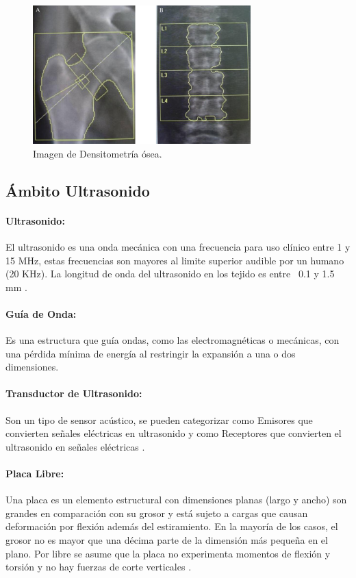 \begin{figure}[H]
    \centering
    \includegraphics[width=0.75\textwidth]{imagenes/image6.jpg}
    \caption{Imagen de Densitometría ósea.}
    \label{fig:bmd}
\end{figure}

\subsection{Ámbito Ultrasonido}

\paragraph{Ultrasonido:}
El ultrasonido es una onda mecánica con una frecuencia para uso clínico entre 1 y 15 MHz, estas frecuencias son mayores al limite superior audible por un humano (20 KHz). La longitud de onda del ultrasonido en los tejido es entre ~0.1 y 1.5 mm
\cite{nadinebarriesmith2010}
\cite{Abu-Zidan2011}.

\paragraph{Guía de Onda:}
Es una estructura que guía ondas, como las electromagnéticas o mecánicas, con una pérdida mínima de energía al restringir la expansión a una o dos dimensiones.

\paragraph{Transductor de Ultrasonido:}
Son un tipo de sensor acústico, se pueden categorizar como Emisores que convierten señales eléctricas en ultrasonido y como Receptores que convierten el ultrasonido en señales eléctricas
\cite{nakamura2012ultrasonic}.

\paragraph{Placa Libre:}
Una placa es un elemento estructural con dimensiones planas (largo y ancho) son grandes en comparación con su grosor y está sujeto a cargas que causan deformación por flexión además del estiramiento.
En la mayoría de los casos, el grosor no es mayor que una décima parte de la dimensión más pequeña en el plano.
Por libre se asume que la placa no experimenta momentos de flexión y torsión y no hay fuerzas de corte verticales
\cite{ensminger2008ultrasonics}.

